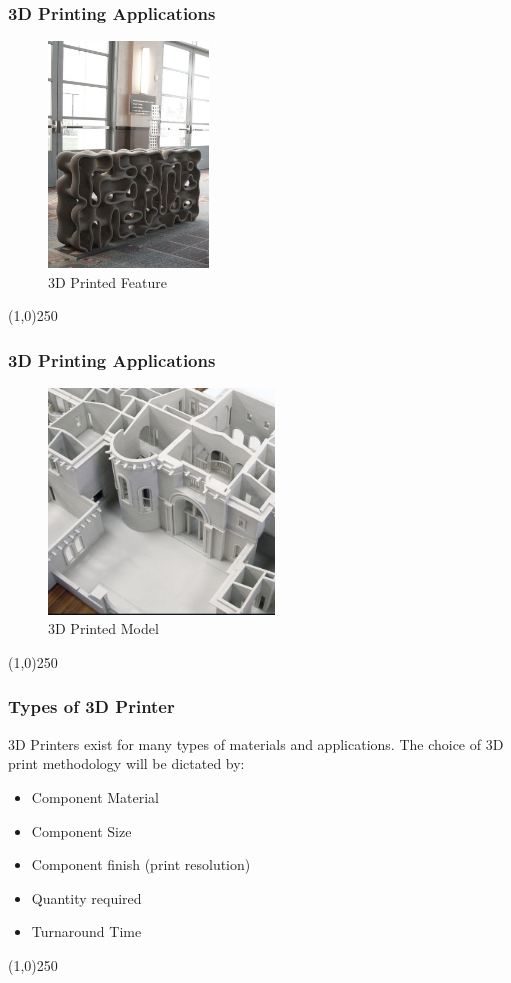 \begin{frame}
\frametitle{3D Printing Applications}
\begin{figure}[h]
	\centering
	\includegraphics[height=6cm]{img/3DPrinting/3dprintFeature.jpg}
	\caption[3D Printed Feature]{3D Printed Feature}
	\label{fig:3dprintFeature}
\end{figure}
\end{frame}
\begin{center}\line(1,0){250}\end{center}


\begin{frame}
\frametitle{3D Printing Applications}
\begin{figure}[h]
	\centering
	\includegraphics[height=6cm]{img/3DPrinting/3dprintModel.jpg}
	\caption[3D Printed Model]{3D Printed Model}
	\label{fig:3dprintModel}
\end{figure}
\end{frame}
\begin{center}\line(1,0){250}\end{center}




\begin{frame}
\frametitle{Types of 3D Printer}
3D Printers exist for many types of materials and applications.  The choice of 3D print methodology will be dictated by:
\begin{itemize}
	\item Component Material
	\item Component Size
	\item Component finish (print resolution)
	\item Quantity required
	\item Turnaround Time
\end{itemize}

\end{frame}
\begin{center}\line(1,0){250}\end{center}

